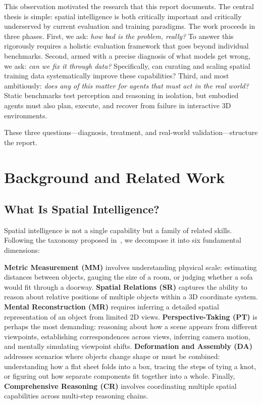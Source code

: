 \documentclass[
hf,
]{confart}
\begin{document}
This observation motivated the research that this report documents. The central thesis is simple: spatial intelligence is both critically important and critically underserved by current evaluation and training paradigms. The work proceeds in three phases. First, we ask: \textit{how bad is the problem, really?} To answer this rigorously requires a holistic evaluation framework that goes beyond individual benchmarks. Second, armed with a precise diagnosis of what models get wrong, we ask: \textit{can we fix it through data?} Specifically, can curating and scaling spatial training data systematically improve these capabilities? Third, and most ambitiously: \textit{does any of this matter for agents that must act in the real world?} Static benchmarks test perception and reasoning in isolation, but embodied agents must also plan, execute, and recover from failure in interactive 3D environments.

These three questions---diagnosis, treatment, and real-world validation---structure the report.


\section{Background and Related Work}
\label{sec:background}

\subsection{What Is Spatial Intelligence?}

Spatial intelligence is not a single capability but a family of related skills. Following the taxonomy proposed in~\cite{cai2025holisticevaluationmultimodalllms}, we decompose it into six fundamental dimensions:

\textbf{Metric Measurement (MM)} involves understanding physical scale: estimating distances between objects, gauging the size of a room, or judging whether a sofa would fit through a doorway. \textbf{Spatial Relations (SR)} captures the ability to reason about relative positions of multiple objects within a 3D coordinate system. \textbf{Mental Reconstruction (MR)} requires inferring a detailed spatial representation of an object from limited 2D views. \textbf{Perspective-Taking (PT)} is perhaps the most demanding: reasoning about how a scene appears from different viewpoints, establishing correspondences across views, inferring camera motion, and mentally simulating viewpoint shifts. \textbf{Deformation and Assembly (DA)} addresses scenarios where objects change shape or must be combined: understanding how a flat sheet folds into a box, tracing the steps of tying a knot, or figuring out how separate components fit together into a whole. Finally, \textbf{Comprehensive Reasoning (CR)} involves coordinating multiple spatial capabilities across multi-step reasoning chains.
\end{document}
